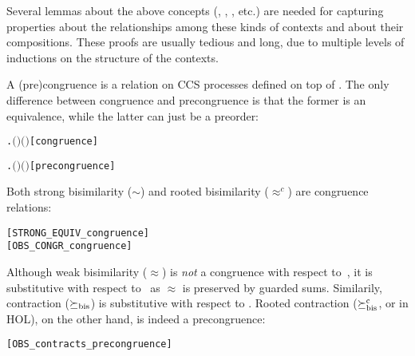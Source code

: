 Several
lemmas about the above concepts (, ,
, etc.) are needed for capturing properties about
 the relationships among these kinds of contexts and about their
 compositions. These proofs are usually tedious and long,  due to multiple levels of
 inductions on the structure of the contexts.

A (pre)congruence is a relation on CCS processes defined on top of
. The only difference between congruence and
precongruence is that the former is an equivalence,
while the latter can just be a preorder:
\begin{alltt}
     \HOLTokenDefEquality{}
       \HOLSymConst{\HOLTokenConj{}} \HOLSymConst{\HOLTokenForall{}}  .   \HOLSymConst{\HOLTokenImp{}}    \HOLSymConst{\HOLTokenImp{}}  \ensuremath{(} \ensuremath{)} \ensuremath{(} \ensuremath{)}\hfill{[congruence]}

     \HOLTokenDefEquality{}
       \HOLSymConst{\HOLTokenConj{}} \HOLSymConst{\HOLTokenForall{}}  .   \HOLSymConst{\HOLTokenImp{}}    \HOLSymConst{\HOLTokenImp{}}  \ensuremath{(} \ensuremath{)} \ensuremath{(} \ensuremath{)}\hfill{[precongruence]}
\end{alltt}

Both strong bisimilarity ($\sim$) and
rooted bisimilarity ($\approx^c$) are congruence relations:
\begin{alltt}
\HOLTokenTurnstile{}  \hfill{[STRONG_EQUIV_congruence]}
\HOLTokenTurnstile{}  \hfill{[OBS_CONGR_congruence]}
\end{alltt}

Although weak bisimilarity ($\approx$) is \emph{not} a congruence
with respect to~, it is substitutive
with respect to~
as $\approx$ is preserved by guarded sums. Similarily,
contraction ($\mathrel{\succeq_{\rm{bis}}}$) is substitutive with respect to .
%
Rooted contraction ($\mathrel{\succeq^{\rm{c}}_{\rm{bis}}}$, or  in HOL), on
the other hand, is indeed a precongruence:
\begin{alltt}
\HOLTokenTurnstile{}  \hfill{[OBS_contracts_precongruence]}
\end{alltt}

